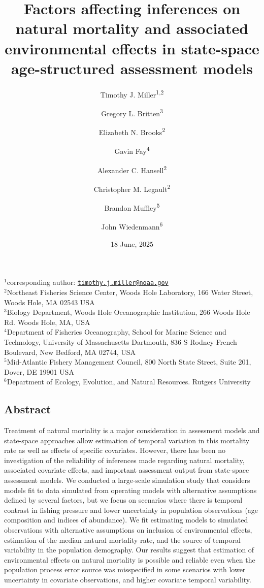 \documentclass[
  12pt,
]{article}
\title{Factors affecting inferences on natural mortality and associated environmental effects in state-space age-structured assessment models}
\author{Timothy J. Miller\textsuperscript{1,2} \and Gregory L. Britten\textsuperscript{3} \and Elizabeth N. Brooks\textsuperscript{2} \and Gavin Fay\textsuperscript{4} \and Alexander C. Hansell\textsuperscript{2} \and Christopher M. Legault\textsuperscript{2} \and Brandon Muffley\textsuperscript{5} \and John Wiedenmann\textsuperscript{6}}
\date{18 June, 2025}
\begin{document}
\maketitle

\(^1\)corresponding author: \href{mailto:timothy.j.miller@noaa.gov}{\nolinkurl{timothy.j.miller@noaa.gov}}\\
\(^2\)Northeast Fisheries Science Center, Woods Hole Laboratory, 166 Water Street, Woods Hole, MA 02543 USA\\
\(^3\)Biology Department, Woods Hole Oceanographic Institution, 266 Woods Hole Rd. Woods Hole, MA, USA\\
\(^4\)Department of Fisheries Oceanography, School for Marine Science and Technology, University of Massachusetts Dartmouth, 836 S Rodney French Boulevard, New Bedford, MA 02744, USA\\
\(^5\)Mid-Atlantic Fishery Management Council, 800 North State Street, Suite 201, Dover, DE 19901 USA\\
\(^6\)Department of Ecology, Evolution, and Natural Resources. Rutgers University\\

\pagebreak

\hypertarget{abstract}{%
\subsection*{Abstract}\label{abstract}}

Treatment of natural mortality is a major consideration in assessment models and state-space approaches allow estimation of temporal variation in this mortality rate as well as effects of specific covariates. However, there has been no investigation of the reliability of inferences made regarding natural mortality, associated covariate effects, and important assessment output from state-space assessment models. We conducted a large-scale simulation study that considers models fit to data simulated from operating models with alternative assumptions defined by several factors, but we focus on scenarios where there is temporal contrast in fishing pressure and lower uncertainty in population observations (age composition and indices of abundance). We fit estimating models to simulated observations with alternative assumptions on inclusion of environmental effects, estimation of the median natural mortality rate, and the source of temporal variability in the population demography. Our results suggest that estimation of environmental effects on natural mortality is possible and reliable even when the population process error source was misspecified in some scenarios with lower uncertainty in covariate observations, and higher covariate temporal variability.
\end{document}
